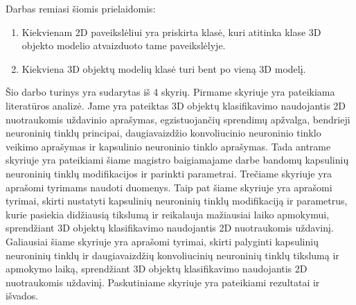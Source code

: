Darbas remiasi šiomis prielaidomis:

\begin{enumerate}
	\item Kiekvienam 2D paveikslėliui yra priskirta klasė, kuri atitinka klase 3D objekto modelio atvaizduoto tame paveikslėlyje.
	\item Kiekviena 3D objektų modelių klasė turi bent po vieną 3D modelį.
\end{enumerate}

Šio darbo turinys yra sudarytas iš 4 skyrių. Pirmame skyriuje yra pateikiama literatūros analizė. Jame yra pateiktas 3D objektų klasifikavimo naudojantis 2D nuotraukomis uždavinio aprašymas, egzistuojančių sprendimų apžvalga, bendrieji neuroninių tinklų principai, daugiavaizdžio konvoliucinio neuroninio tinklo veikimo aprašymas ir kapsulinio neuroninio tinklo aprašymas.
Tada antrame skyriuje yra pateikiami šiame magistro baigiamajame darbe bandomų kapsulinių neuroninių tinklų modifikacijos ir parinkti parametrai.
Trečiame skyriuje yra aprašomi tyrimams naudoti duomenys.
Taip pat šiame skyriuje yra aprašomi tyrimai, skirti nustatyti kapsulinių neuroninių tinklų modifikaciją ir parametrus, kurie pasiekia didžiausią tikslumą ir reikalauja mažiausiai laiko apmokymui, sprendžiant 3D objektų klasifikavimo naudojantis 2D nuotraukomis uždavinį.
Galiausiai šiame skyriuje yra aprašomi tyrimai, skirti palyginti kapsulinių neuroninių tinklų ir daugiavaizdžių konvoliucinių neuroninių tinklų tikslumą ir apmokymo laiką, sprendžiant 3D objektų klasifikavimo naudojantis 2D nuotraukomis uždavinį.
Paskutiniame skyriuje yra pateikiami rezultatai ir išvados.
